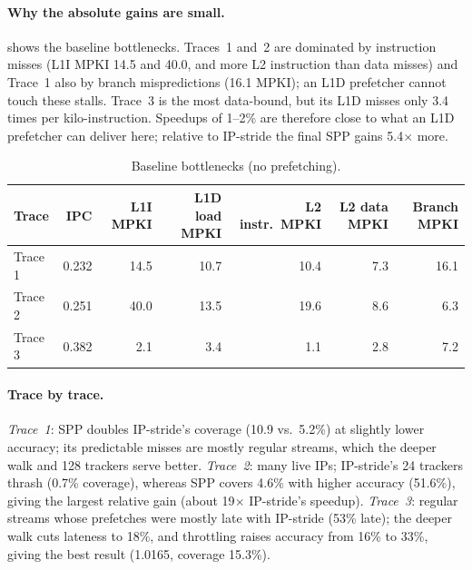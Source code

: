 \documentclass[11pt,a4paper]{article}
\theoremstyle{themethm}
\theoremstyle{themedef}
\theoremstyle{themeex}
\theoremstyle{themerem}
\newcommand{\tablesetup}{%
  \arrayrulecolor{tablerule}%
  \setlength{\aboverulesep}{0pt}\setlength{\belowrulesep}{0pt}%
  \renewcommand{\arraystretch}{1.3}%
  \rowcolors{2}{white}{tablerow}}
\newcommand{\colhead}[1]{\textbf{\color{tableheadtext}#1}}
\begin{document}
\paragraph{Why the absolute gains are small.}  shows the
baseline bottlenecks. Traces~1 and~2 are dominated by instruction misses
(L1I MPKI 14.5 and 40.0, and more L2 instruction than data misses) and
Trace~1 also by branch mispredictions (16.1 MPKI); an L1D prefetcher cannot
touch these stalls. Trace~3 is the most data-bound, but its L1D misses only
3.4 times per kilo-instruction. Speedups of 1--2\% are therefore close to what
an L1D prefetcher can deliver here; relative to IP-stride the final SPP gains
5.4$\times$ more.

\begin{table}[htbp]
\centering
\caption{Baseline bottlenecks (no prefetching).}\label{tab:frontend}
\tablesetup
\begin{tabular}{lrrrrrr}
\toprule
\rowcolor{tablehead}\colhead{Trace} & \colhead{IPC} & \colhead{L1I MPKI} & \colhead{L1D load MPKI} & \colhead{L2 instr.\ MPKI} & \colhead{L2 data MPKI} & \colhead{Branch MPKI} \\
\midrule
Trace 1 & 0.232 & 14.5 & 10.7 & 10.4 & 7.3 & 16.1 \\
Trace 2 & 0.251 & 40.0 & 13.5 & 19.6 & 8.6 & 6.3 \\
Trace 3 & 0.382 & 2.1 & 3.4 & 1.1 & 2.8 & 7.2 \\
\bottomrule
\end{tabular}
\end{table}

\paragraph{Trace by trace.} \emph{Trace~1}: SPP doubles IP-stride's coverage
(10.9 vs.\ 5.2\%) at slightly lower accuracy; its predictable misses are mostly
regular streams, which the deeper walk and 128 trackers serve better.
\emph{Trace~2}: many live IPs; IP-stride's 24 trackers thrash (0.7\% coverage),
whereas SPP covers 4.6\% with higher accuracy (51.6\%), giving the largest
relative gain (about 19$\times$ IP-stride's speedup). \emph{Trace~3}: regular streams
whose prefetches were mostly late with IP-stride (53\% late); the deeper walk
cuts lateness to 18\%, and throttling raises accuracy from 16\% to 33\%,
giving the best result (1.0165, coverage 15.3\%).
\end{document}

